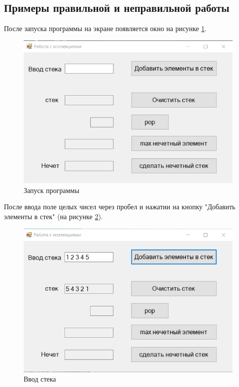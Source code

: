 \subsection{Примеры правильной и неправильной работы}
После запуска программы на экране появляется окно на рисунке \ref{task7_launch1}.
\begin{figure}[H]
    \centering
    \includegraphics[width=0.8\linewidth]{lections/img/task7_launch1.png}
    \caption{Запуск программы}
    \label{task7_launch1}
\end{figure}

После ввода поле целых чисел через пробел и нажатии на кнопку "Добавить элементы в стек" (на рисунке \ref{task7_launch2}).

\begin{figure}[H]
    \centering
    \includegraphics[width=0.8\linewidth]{lections/img/task7_launch2.png}
    \caption{Ввод стека}
    \label{task7_launch2}
\end{figure}

